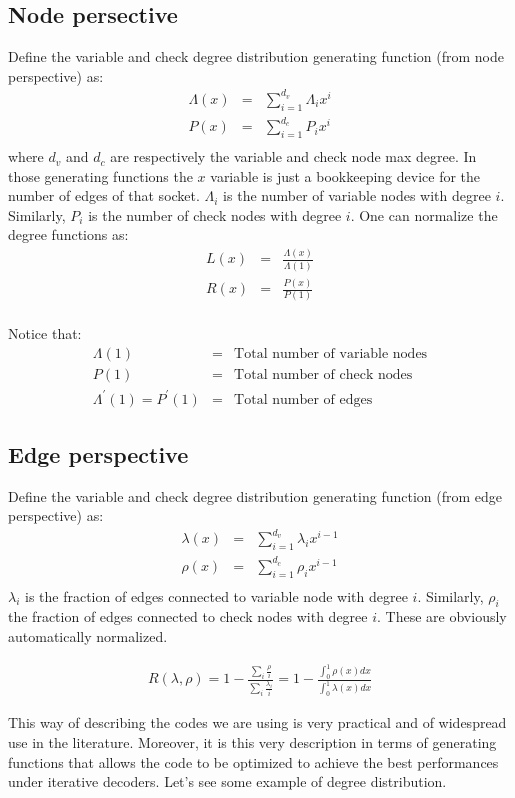 \subsection{Node persective}
Define the variable and check degree distribution generating function (from node perspective) as:
\begin{eqnarray}
	\Lambda(x) &=& \sum_{i=1}^{d_v} \Lambda_i x^i \\
	P(x) &=& \sum_{i=1}^{d_c} P_i x^i \\
\end{eqnarray} 
where $d_v$ and $d_c$ are respectively the variable and check node max degree. In those generating functions the $x$ variable is just a bookkeeping device for the number of edges of that socket.
$\Lambda_i$ is the number of variable nodes with degree $i$. Similarly, $P_i$ is the number of check nodes with degree $i$. One can normalize the degree functions as: 
\begin{eqnarray}
L(x) &=& \frac{\Lambda(x)}{\Lambda(1)} \\
R(x) &=& \frac{P(x)}{P(1)} \\
\end{eqnarray} 

Notice that:
\begin{eqnarray}
\Lambda(1) &=& \text{Total number of variable nodes} \\
P(1) &=& \text{Total number of check nodes} \\
\Lambda^\prime(1) = P^\prime(1) &=&  \text{Total number of edges}
\end{eqnarray} 


\subsection{Edge perspective}
Define the variable and check degree distribution generating function (from edge perspective) as:
\begin{eqnarray}
\lambda(x) &=& \sum_{i=1}^{d_v} \lambda_i x^{i-1} \\
\rho(x) &=& \sum_{i=1}^{d_c} \rho_i x^{i-1} \\
\end{eqnarray} 
$\lambda_i$ is the fraction of edges connected to variable node with degree $i$. Similarly, $\rho_i$ the fraction of edges connected to check nodes with degree $i$. These are obviously automatically normalized. 
\begin{definition}
	\begin{eqnarray}
	R(\lambda, \rho) = 1 - \frac{\sum_i \frac{\rho}{i}}{\sum_i \frac{\lambda_i}{i}} = 1 - \frac{\int_0^1 \rho(x)dx}{\int_0^1 \lambda(x)dx}
	\end{eqnarray}
\end{definition}
This way of describing the codes we are using is very practical and of widespread use in the literature. Moreover, it is this very description in terms of generating functions that allows the code to be optimized to achieve the best performances under iterative decoders. 
Let's see some example of degree distribution.  
